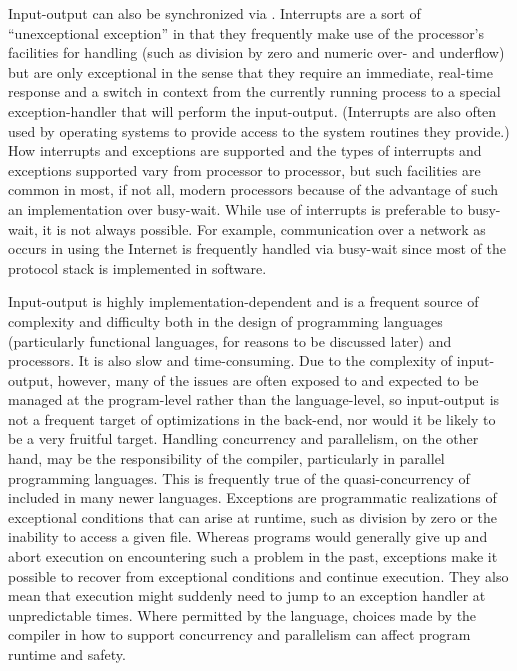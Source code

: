 Input-output can also be synchronized via . Interrupts are a sort of ``unexceptional exception'' in that they frequently make use of the processor's facilities for handling  (such as division by zero and numeric over- and underflow) but are only exceptional in the sense that they require an immediate, real-time response and a switch in context from the currently running process to a special exception-handler that will perform the input-output. (Interrupts are also often used by operating systems to provide access to the system routines they provide.) How interrupts and exceptions are supported and the types of interrupts and exceptions supported vary from processor to processor, but such facilities are common in most, if not all, modern processors because of the advantage of such an implementation over busy-wait. While use of interrupts is preferable to busy-wait, it is not always possible. For example, communication over a network as occurs in using the Internet is frequently handled via busy-wait since most of the protocol stack is implemented in software.

Input-output is highly implementation-dependent and is a frequent source of complexity and difficulty both in the design of programming languages (particularly functional languages, for reasons to be discussed later) and processors. %
It is also slow and time-consuming. Due to the complexity of input-output, however, many of the issues are often exposed to and expected to be managed at the program-level rather than the language-level, so input-output is not a frequent target of optimizations in the back-end, nor would it be likely to be a very fruitful target. Handling concurrency and parallelism, on the other hand, may be the responsibility of the compiler, particularly in parallel programming languages. This is frequently true of the quasi-concurrency of  included in many newer languages. Exceptions are programmatic realizations of exceptional conditions that can arise at runtime, such as division by zero or the inability to access a given file. Whereas programs would generally give up and abort execution on encountering such a problem in the past, exceptions make it possible to recover from exceptional conditions and continue execution. They also mean that execution might suddenly need to jump to an exception handler at unpredictable times. Where permitted by the language, choices made by the compiler in how to support concurrency and parallelism can affect program runtime and safety.

